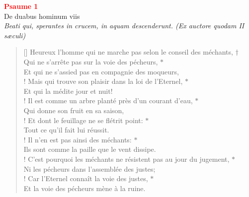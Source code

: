 
\def\greinitialformat#1{%
{\fontsize{39}{39}\selectfont #1}%
}




\vspace*{\fill}

\begin{center}
 \textcolor{red}{\large \bf Psaume 1}\\
De duabus hominum viis\\
\textit{\small Beati qui, sperantes in crucem, in aquam descenderunt. (Ex auctore quodam II sæculi)}
\end{center}
\begin{verse}[\versewidth]
Heureux l’homme qui ne marche pas selon le conseil des méchants, $\dagger$\\
Qui ne s’arrête pas sur la voie des pécheurs, $\ast$\\
Et qui ne s’assied pas en compagnie des moqueurs,\\!
\vin  Mais qui trouve son plaisir dans la loi de l’Eternel, $\ast$\\
\vin  Et qui la médite jour et nuit!\\!
Il est comme un arbre planté près d’un courant d’eau, $\ast$\\
Qui donne son fruit en sa saison, \\!
\vin  Et dont le feuillage ne se flétrit point: $\ast$\\
\vin  Tout ce qu’il fait lui réussit. \\!
Il n’en est pas ainsi des méchants: $\ast$\\
Ils sont comme la paille que le vent dissipe. \\!
\vin  C’est pourquoi les méchants ne résistent pas au jour du jugement, $\ast$\\
\vin  Ni les pécheurs dans l’assemblée des justes;\\!
Car l’Eternel connaît la voie des justes, $\ast$\\
Et la voie des pécheurs mène à la ruine.

\end{verse}
\newpage


